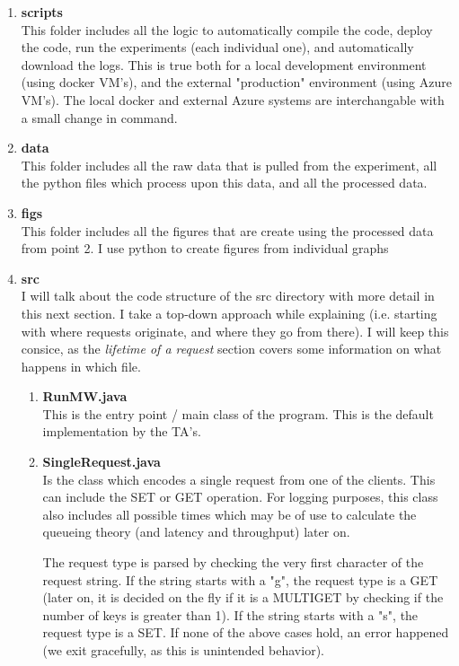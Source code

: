 \documentclass[11pt,a4paper]{article}
\begin{document}
\begin{enumerate}
\item \textbf{scripts} \\
This folder includes all the logic to automatically compile the code, deploy the code, run the experiments (each individual one), and automatically download the logs.
This is true both for a local development environment (using docker VM's), and the external "production" environment (using Azure VM's). 
The local docker and external Azure systems are interchangable with a small change in command.

\item \textbf{data} \\
This folder includes all the raw data that is pulled from the experiment, all the python files which process upon this data, and all the processed data.

\item \textbf{figs} \\
This folder includes all the figures that are create using the processed data from point 2.
I use python to create figures from individual graphs

\item \textbf{src} \\
I will talk about the code structure of the src directory with more detail in this next section.
I take a top-down approach while explaining (i.e. starting with where requests originate, and where they go from there).
I will keep this consice, as the \textit{lifetime of a request} section covers some information on what happens in which file.

\begin{enumerate}
\item \textbf{RunMW.java} \\
This is the entry point / main class of the program.
This is the default implementation by the TA's.


\item \textbf{SingleRequest.java} \\
Is the class which encodes a single request from one of the clients.
This can include the SET or GET operation.
For logging purposes, this class also includes all possible times which may be of use to calculate the queueing theory (and latency and throughput) later on.

The request type is parsed by checking the very first character of the request string.
If the string starts with a "g", the request type is a GET (later on, it is decided on the fly if it is a MULTIGET by checking if the number of keys is greater than 1).
If the string starts with a "s", the request type is a SET.
If none of the above cases hold, an error happened (we exit gracefully, as this is unintended behavior).


\end{enumerate}
\end{enumerate}
\end{document}
